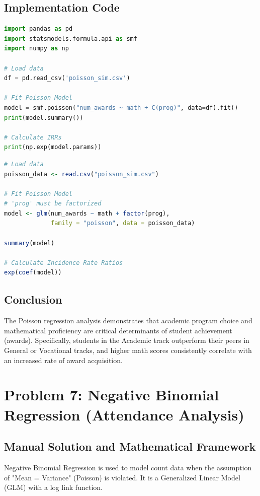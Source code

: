 \documentclass[12pt, a4paper]{article}
\begin{document}
\subsection{Implementation Code}

\begin{lstlisting}[language=Python, caption=Python implementation for Poisson Regression]
import pandas as pd
import statsmodels.formula.api as smf
import numpy as np

# Load data
df = pd.read_csv('poisson_sim.csv')

# Fit Poisson Model
model = smf.poisson("num_awards ~ math + C(prog)", data=df).fit()
print(model.summary())

# Calculate IRRs
print(np.exp(model.params))
\end{lstlisting}

\begin{lstlisting}[language=R, caption=R implementation for Poisson Regression]
# Load data
poisson_data <- read.csv("poisson_sim.csv")

# Fit Poisson Model
# 'prog' must be factorized
model <- glm(num_awards ~ math + factor(prog), 
             family = "poisson", data = poisson_data)

summary(model)

# Calculate Incidence Rate Ratios
exp(coef(model))
\end{lstlisting}

\subsection{Conclusion}
The Poisson regression analysis demonstrates that academic program choice and mathematical proficiency are critical determinants of student achievement (awards). Specifically, students in the Academic track outperform their peers in General or Vocational tracks, and higher math scores consistently correlate with an increased rate of award acquisition.

\newpage
\section{Problem 7: Negative Binomial Regression (Attendance Analysis)}
\label{prob_nb_attendance}

\subsection{Manual Solution and Mathematical Framework}
Negative Binomial Regression is used to model count data when the assumption of "Mean = Variance" (Poisson) is violated. It is a Generalized Linear Model (GLM) with a log link function.
\end{document}
